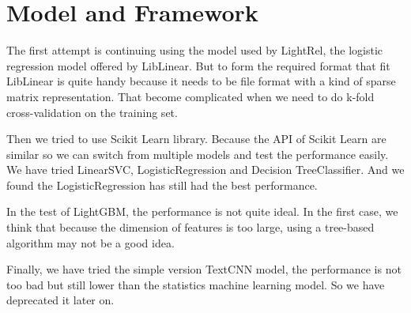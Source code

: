 \section{Model and Framework}

The first attempt is continuing using the model used by LightRel, the logistic regression model offered by LibLinear. But to form the required format that fit LibLinear is quite handy because it needs to be file format with a kind of sparse matrix representation. That become complicated when we need to do k-fold cross-validation on the training set.

Then we tried to use Scikit Learn library. Because the API of Scikit Learn are similar so we can switch from multiple models and test the performance easily. We have tried LinearSVC, LogisticRegression and Decision TreeClassifier. And we found the LogisticRegression has still had the best performance.

In the test of LightGBM, the performance is not quite ideal. In the first case, we think that because the dimension of features is too large, using a tree-based algorithm may not be a good idea.

Finally, we have tried the simple version TextCNN model, the performance is not too bad but still lower than the statistics machine learning model. So we have deprecated it later on.